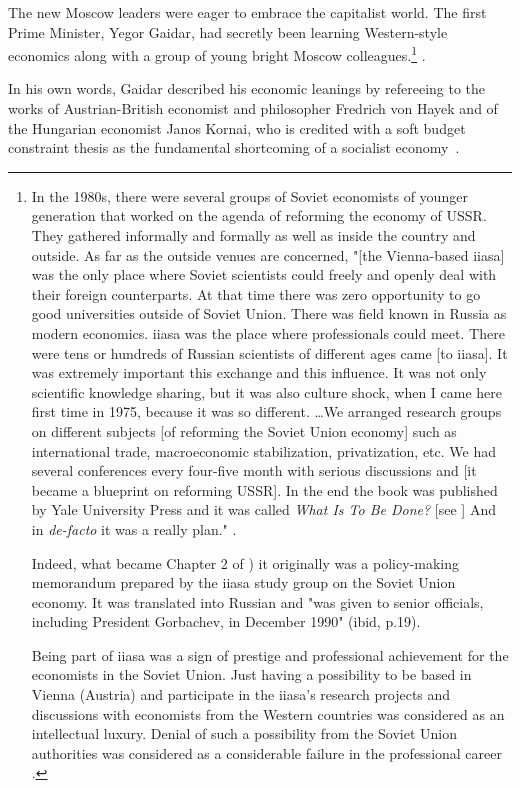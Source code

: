 The new Moscow leaders were eager to embrace the capitalist world. The first Prime Minister, Yegor Gaidar, had secretly been learning Western-style economics along with a group of young bright Moscow colleagues.\footnote{In the 1980s, there were several groups of Soviet economists of younger generation that worked on the agenda of reforming the economy of USSR. They gathered informally and formally as well as inside the country and outside. As far as the outside venues are concerned, "[the Vienna-based \ac{iiasa}] was the only place where Soviet scientists could freely and openly deal with their foreign counterparts. At that time there was zero opportunity to go good universities outside of Soviet Union. There was field known in Russia as modern economics. \ac{iiasa} was the place where professionals could meet. There were tens or hundreds of Russian scientists of different ages came [to \ac{iiasa}]. It was extremely important this exchange and this influence. It was not only scientific knowledge sharing, but it was also culture shock, when I came here first time in 1975, because it was so different. \dots We arranged research groups on different subjects [of reforming the Soviet Union economy] such as international trade, macroeconomic stabilization, privatization, etc. We had several conferences every four-five month with serious discussions and [it became a blueprint on reforming USSR]. In the end the book was published by Yale University Press and it was called \textit{What Is To Be Done?} [see \citep{peck1991}] And in \textit{de-facto} it was a really plan." \citep[emphasis added]{aven2014}. 

Indeed, what became Chapter 2 of \citep{peck1991}) it originally was a policy-making memorandum prepared by the \ac{iiasa} study group on the Soviet Union economy. It was translated into Russian and "was given to senior officials, including President Gorbachev, in December 1990" (ibid, p.19). 

Being part of \ac{iiasa} was a sign of prestige and professional achievement for the economists in the Soviet Union. Just having a possibility to be based in Vienna (Austria) and participate in the \ac{iiasa}'s research projects and discussions with economists from the Western countries was considered as an intellectual luxury. Denial of such a possibility from the Soviet Union authorities was considered as a considerable failure in the professional career \citep[p.~225]{aven2015}.} \citep[p.~113, emphasis added]{wyplosz2003}.

In his own words, Gaidar described his economic leanings by refereeing to the works of Austrian-British economist and philosopher Fredrich von Hayek and of the Hungarian economist Janos Kornai, who is credited with a soft budget constraint thesis as the fundamental shortcoming of a socialist economy~\citep{gaidar2006}. 

